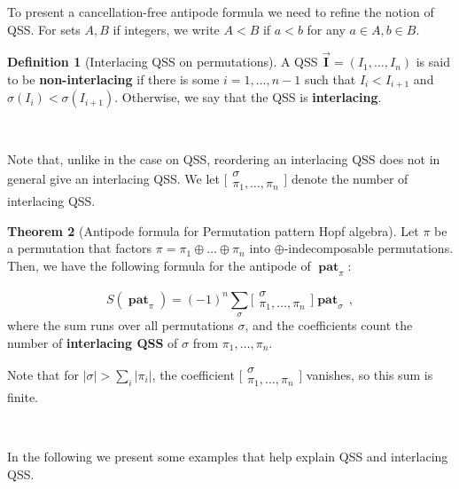 \documentclass[12pt, reqno]{amsart}
\theoremstyle{definition}
\newtheorem{thm}{Theorem}[section]
\newtheorem{defin}[thm]{Definition}
\newcommand{\III}{\vec{\mathbf{I}}}
\DeclareMathOperator{\pat}{\mathbf{pat}}
\begin{document}
To present a cancellation-free antipode formula we need to refine the notion of QSS.
For sets $A, B$ if integers, we write $A <B$ if $a<b $ for any $a\in A, b \in B$.

\begin{defin}[Interlacing QSS on permutations]
A QSS $\III = (I_1, \dots, I_n)$ is said to be \textbf{non-interlacing} if there is some $i=1, \dots, n-1$ such that $I_i < I_{i+1}$ and $\sigma(I_i) < \sigma(I_{i+1})$.
Otherwise, we say that the QSS is \textbf{interlacing}. 

\

Note that, unlike in the case on QSS, reordering an interlacing QSS does not in general give an interlacing QSS.
We let $\bigl[\!\begin{smallmatrix} \sigma \\ \pi_1, \dots, \pi_n \end{smallmatrix}\!\bigr]$ denote the number of interlacing QSS.
\end{defin}


\begin{thm}[Antipode formula for Permutation pattern Hopf algebra]\label{thm:antipode_perms_intro}
Let $\pi$ be a permutation that factors $\pi = \pi_1\oplus \dots \oplus \pi_n$ into $\oplus$-indecomposable permutations.
Then, we have the following formula for the antipode of $\pat_{\pi}$:

$$S(\pat_{\pi}) = (-1)^n \sum_{\sigma} \bigl[\!\begin{smallmatrix} \sigma \\ \pi_1, \dots, \pi_n \end{smallmatrix}\!\bigr] \pat_{\sigma}\, ,$$
where the sum runs over all permutations $\sigma$, and the coefficients count the number of \textbf{interlacing QSS} of $\sigma$ from $\pi_1, \dots, \pi_n$.
\end{thm}

Note that for $|\sigma| > \sum_i |\pi_i|$, the coefficient $\bigl[\!\begin{smallmatrix} \sigma \\ \pi_1, \dots, \pi_n \end{smallmatrix}\!\bigr]$ vanishes, so this sum is finite.

\

In the following we present some examples that help explain QSS and interlacing QSS.

\
\end{document}
